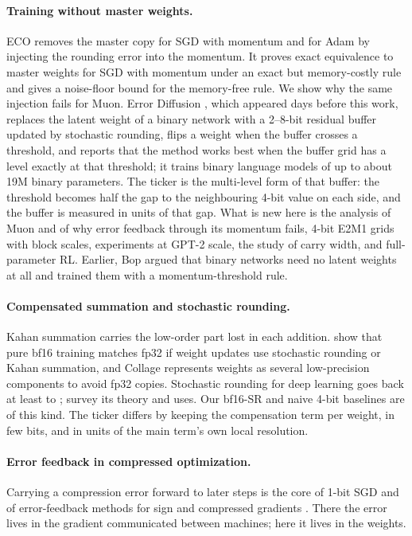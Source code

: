 \documentclass[11pt]{article}
\begin{document}
\paragraph{Training without master weights.} ECO \citep{nikdan2026eco} removes the master copy for SGD with momentum
and for Adam by injecting the rounding error into the momentum. It proves exact equivalence to master weights for SGD
with momentum under an exact but memory-costly rule and gives a noise-floor bound for the memory-free rule. We show
why the same injection fails for Muon. Error Diffusion \citep{bonin2026errordiffusion}, which appeared days before
this work, replaces the latent weight of a binary network with a 2--8-bit residual buffer updated by stochastic
rounding, flips a weight when the buffer crosses a threshold, and reports that the method works best when the buffer
grid has a level exactly at that threshold; it trains binary language models of up to about 19M binary parameters.
The ticker is the multi-level form of that buffer: the threshold becomes half the gap to the neighbouring 4-bit value
on each side, and the buffer is measured in units of that gap. What is new here is the analysis of Muon and of why
error feedback through its momentum fails, 4-bit E2M1 grids with block scales, experiments at GPT-2 scale, the study of
carry width, and full-parameter RL. Earlier, Bop \citep{helwegen2019bop} argued that binary networks need no latent
weights at all and trained them with a momentum-threshold rule.

\paragraph{Compensated summation and stochastic rounding.} Kahan summation \citep{kahan1965} carries the low-order
part lost in each addition. \citet{zamirai2020bf16} show that pure bf16 training matches fp32 if weight updates use
stochastic rounding or Kahan summation, and Collage \citep{yu2024collage} represents weights as several low-precision
components to avoid fp32 copies. Stochastic rounding for deep learning goes back at least to
\citet{gupta2015limited}; \citet{croci2022sr} survey its theory and uses. Our bf16-SR and naive 4-bit baselines are of
this kind. The ticker differs by keeping the compensation term per weight, in few bits, and in units of the main
term's own local resolution.

\paragraph{Error feedback in compressed optimization.} Carrying a compression error forward to later steps is the
core of 1-bit SGD \citep{seide2014onebit} and of error-feedback methods for sign and compressed gradients
\citep{karimireddy2019efsgd}. There the error lives in the gradient communicated between machines; here it lives in
the weights.
\end{document}
